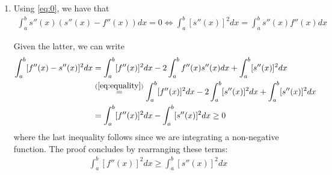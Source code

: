 \documentclass{article}
\begin{document}
\begin{enumerate}[label=(\roman*)]
        \item Using \eqref{eq:0}, we have that
        \begin{align}
            \int_a^b s''(x)(s''(x) - f''(x)) dx = 0 \Longleftrightarrow \int_a^b [s''(x)]^2dx = \int_a^b s''(x) f''(x) dx
            \label{eq:equality}
        \end{align}
        
        Given the latter, we can write
        \begin{align}
           \int_{a}^b [f''(x)-s''(x)]^2 dx &=  \int_{a}^b [f''(x)]^2 dx -  2\int_{a}^b f''(x)s''(x)dx +  \int_{a}^b [s''(x)]^2 dx \\
           &\refEQ{eq:equality} \int_{a}^b [f''(x)]^2 dx -  2\int_{a}^b [s''(x)]^2 dx +  \int_{a}^b [s''(x)]^2 dx \\
           &=\int_{a}^b [f''(x)]^2 dx - \int_{a}^b [s''(x)]^2 dx \geq 0
        \end{align}
        where the last inequality follows since we are integrating a non-negative function. The proof concludes by rearranging these terms:
        \begin{align}
          \int_{a}^b [f''(x)]^2 dx \geq \int_{a}^b [s''(x)]^2 dx
        \end{align}
    \end{enumerate}
\end{document}
